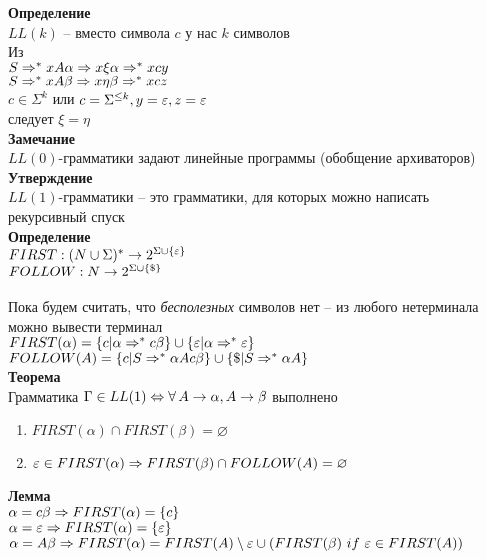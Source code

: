 \documentclass[12pt]{article}
\begin{document}
\textbf{Определение}\\
$LL(k)$ -- вместо символа $c$ у нас $k$ символов\\
Из\\
$S \Rightarrow^* xA\alpha \Rightarrow x\xi\alpha \Rightarrow^* xcy$\\
$S \Rightarrow^* xA\beta \Rightarrow x\eta\beta \Rightarrow^* xcz$\\
$c \in \Sigma^k$ или $c=\Sigma^{\leq k}, y=\varepsilon, z = \varepsilon$\\
следует $\xi = \eta$\\
\textbf{Замечание}\\
$LL(0)$-грамматики задают линейные программы (обобщение архиваторов)\\
\textbf{Утверждение}\\
$LL(1)$-грамматики -- это грамматики, для которых можно написать рекурсивный спуск\\
\textbf{Определение}\\
$FIRST: (N \cup \Sigma)^* \rightarrow 2^{\Sigma \cup \{\varepsilon\}}$\\
$FOLLOW: N \rightarrow 2^{\Sigma \cup \{\$\}}$\\\\
Пока будем считать, что \textit{бесполезных} символов нет -- из любого нетерминала можно вывести терминал\\
$FIRST(\alpha) = \{c | \alpha \Rightarrow^* c\beta\} \cup \{\varepsilon | \alpha \Rightarrow^* \varepsilon\}$\\
$FOLLOW(A) = \{c| S\Rightarrow^* \alpha Ac\beta\} \cup \{\$ | S \Rightarrow^* \alpha A\}$\\
\textbf{Теорема}\\
Грамматика $\Gamma \in LL(1) \Leftrightarrow \forall\, A \rightarrow \alpha, A \rightarrow \beta$ выполнено
\begin{enumerate}
	\item $FIRST(\alpha) \cap FIRST(\beta) = \varnothing$
	\item $\varepsilon \in FIRST(\alpha) \Rightarrow FIRST(\beta) \cap FOLLOW(A) = \varnothing$
\end{enumerate}
\textbf{Лемма}\\
$\alpha = c\beta \Rightarrow FIRST(\alpha) = \{c\}$\\
$\alpha = \varepsilon \Rightarrow FIRST(\alpha) = \{\varepsilon\}$\\
$\alpha = A\beta \Rightarrow FIRST(\alpha) = FIRST(A) \setminus \varepsilon \cup (FIRST(\beta)\ if\ \varepsilon \in FIRST(A))$\\
\end{document}

